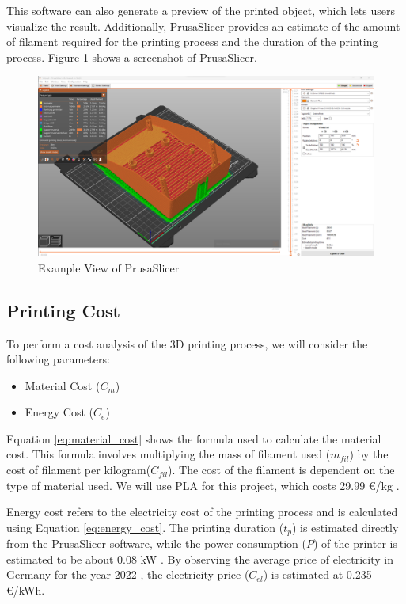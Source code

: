 This software can also generate a preview of the printed object, which lets users visualize the result. Additionally, PrusaSlicer provides an estimate of the amount of filament required for the printing process and the duration of the printing process. Figure \ref{fig:prusa_slicer} shows a screenshot of PrusaSlicer.

\begin{figure}
  \centering
  \includegraphics[width=0.8\linewidth]{texs/Part1/chapter1/image/prusaslicer.png}
  \caption{Example View of PrusaSlicer}
  \label{fig:prusa_slicer}
\end{figure}


\subsection{Printing Cost}
\label{subsec:printing_cost}

To perform a cost analysis of the 3D printing process, we will consider the following parameters:

\begin{itemize}
  \item Material Cost ($C_m$)
  \item Energy Cost ($C_e$)
\end{itemize}

Equation \ref{eq:material_cost} shows the formula used to calculate the material cost. This formula involves multiplying the mass of filament used ($m_{fil}$) by the cost of filament per kilogram($C_{fil}$). The cost of the filament is dependent on the type of material used. We will use PLA for this project, which costs 29.99 €/kg \cite{PrusaCost}.

Energy cost refers to the electricity cost of the printing process and is calculated using Equation \ref{eq:energy_cost}. The printing duration ($t_p$) is estimated directly from the PrusaSlicer software, while the power consumption ($P$) of the printer is estimated to be about 0.08 kW \cite{Prusa}. By observing the average price of electricity in Germany for the year 2022 \cite{NordPool}, the electricity price ($C_{el}$) is estimated at 0.235 €/kWh.

